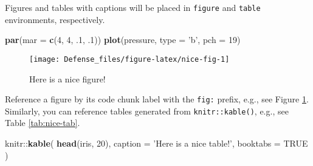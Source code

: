 \documentclass[]{book}
\newenvironment{Shaded}{\begin{snugshade}}{\end{snugshade}}
\newcommand{\KeywordTok}[1]{\textcolor[rgb]{0.13,0.29,0.53}{\textbf{{#1}}}}
\newcommand{\DataTypeTok}[1]{\textcolor[rgb]{0.13,0.29,0.53}{{#1}}}
\newcommand{\DecValTok}[1]{\textcolor[rgb]{0.00,0.00,0.81}{{#1}}}
\newcommand{\StringTok}[1]{\textcolor[rgb]{0.31,0.60,0.02}{{#1}}}
\newcommand{\OtherTok}[1]{\textcolor[rgb]{0.56,0.35,0.01}{{#1}}}
\newcommand{\NormalTok}[1]{{#1}}
\theoremstyle{definition}
\theoremstyle{definition}
\theoremstyle{remark}
\begin{document}
Figures and tables with captions will be placed in \texttt{figure} and
\texttt{table} environments, respectively.

\begin{Shaded}
\begin{Highlighting}[]
\KeywordTok{par}\NormalTok{(}\DataTypeTok{mar =} \KeywordTok{c}\NormalTok{(}\DecValTok{4}\NormalTok{, }\DecValTok{4}\NormalTok{, .}\DecValTok{1}\NormalTok{, .}\DecValTok{1}\NormalTok{))}
\KeywordTok{plot}\NormalTok{(pressure, }\DataTypeTok{type =} \StringTok{'b'}\NormalTok{, }\DataTypeTok{pch =} \DecValTok{19}\NormalTok{)}
\end{Highlighting}
\end{Shaded}

\begin{figure}

{\centering \texttt{[image: Defense\_files/figure-latex/nice-fig-1]} 

}

\caption{Here is a nice figure!}\label{fig:nice-fig}
\end{figure}

Reference a figure by its code chunk label with the \texttt{fig:}
prefix, e.g., see Figure \ref{fig:nice-fig}. Similarly, you can
reference tables generated from \texttt{knitr::kable()}, e.g., see Table
\ref{tab:nice-tab}.

\begin{Shaded}
\begin{Highlighting}[]
\NormalTok{knitr::}\KeywordTok{kable}\NormalTok{(}
  \KeywordTok{head}\NormalTok{(iris, }\DecValTok{20}\NormalTok{), }\DataTypeTok{caption =} \StringTok{'Here is a nice table!'}\NormalTok{,}
  \DataTypeTok{booktabs =} \OtherTok{TRUE}
\NormalTok{)}
\end{Highlighting}
\end{Shaded}
\end{document}
